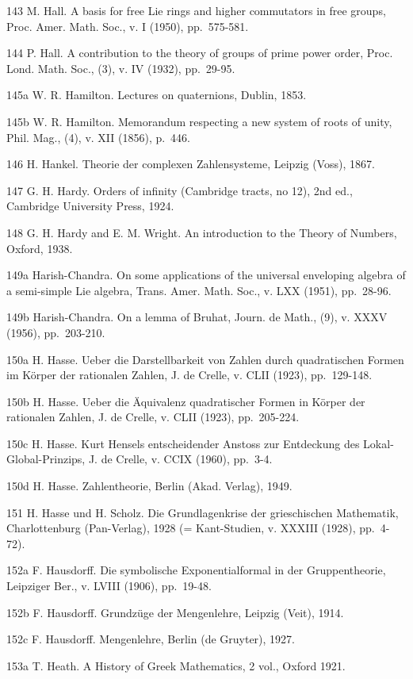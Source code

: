 143 M. Hall. A basis for free Lie rings and higher commutators in free groups, Proc. Amer. Math. Soc., v. I (1950), pp.~575-581.

144 P. Hall. A contribution to the theory of groups of prime power order, Proc. Lond. Math. Soc., (3), v. IV (1932), pp.~29-95.

145a W. R. Hamilton. Lectures on quaternions, Dublin, 1853.

145b W. R. Hamilton. Memorandum respecting a new system of roots of unity, Phil. Mag., (4), v. XII (1856), p.~446.

146 H. Hankel. Theorie der complexen Zahlensysteme, Leipzig (Voss), 1867.

147 G. H. Hardy. Orders of infinity (Cambridge tracts, no 12), 2nd ed., Cambridge University Press, 1924.

148 G. H. Hardy and E. M. Wright. An introduction to the Theory of Numbers, Oxford, 1938.

149a Harish-Chandra. On some applications of the universal enveloping algebra of a semi-simple Lie algebra, Trans. Amer. Math. Soc., v. LXX (1951), pp.~28-96.

149b Harish-Chandra. On a lemma of Bruhat, Journ. de Math., (9), v. XXXV (1956), pp.~203-210.

150a H. Hasse. Ueber die Darstellbarkeit von Zahlen durch quadratischen Formen im Körper der rationalen Zahlen, J. de Crelle, v. CLII (1923), pp.~129-148.

150b H. Hasse. Ueber die Äquivalenz quadratischer Formen in Körper der rationalen Zahlen, J. de Crelle, v. CLII (1923), pp.~205-224.

150c H. Hasse. Kurt Hensels entscheidender Anstoss zur Entdeckung des Lokal-Global-Prinzips, J. de Crelle, v. CCIX (1960), pp.~3-4.

150d H. Hasse. Zahlentheorie, Berlin (Akad. Verlag), 1949.

151 H. Hasse und H. Scholz. Die Grundlagenkrise der grieschischen Mathematik, Charlottenburg (Pan-Verlag), 1928 (= Kant-Studien, v. XXXIII (1928), pp.~4-72).

152a F. Hausdorff. Die symbolische Exponentialformal in der Gruppentheorie, Leipziger Ber., v. LVIII (1906), pp.~19-48.

152b F. Hausdorff. Grundzüge der Mengenlehre, Leipzig (Veit), 1914.

152c F. Hausdorff. Mengenlehre, Berlin (de Gruyter), 1927.

153a T. Heath. A History of Greek Mathematics, 2 vol., Oxford 1921.

